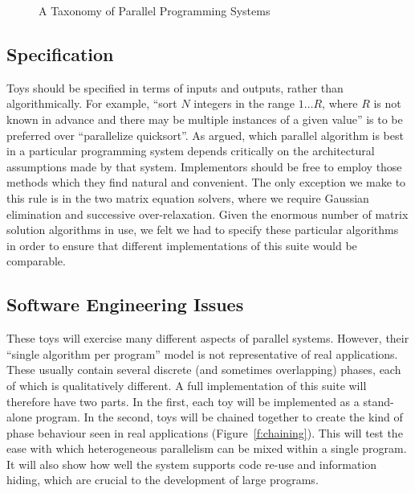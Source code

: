 \begin{figure}
\textheight
\begin{center}\mbox{}\end{center}
\caption{A Taxonomy of Parallel Programming Systems\label{f:taxonomy}}
\end{figure}

\subsection{Specification\label{s:method-spec}}

Toys should be specified in terms of inputs and outputs,
rather than algorithmically.
For example,
``sort $N$ integers in the range $1{\ldots}R$,
where $R$ is not known in advance and there may be multiple instances of a given value''
is to be preferred over
``parallelize quicksort''.
As \cite{b:slalom} argued,
which parallel algorithm is best in a particular programming system
depends critically on the architectural assumptions made by that system.
Implementors should be free to employ those methods which they find natural and convenient.
The only exception we make to this rule is in the two matrix equation solvers,
where we require Gaussian elimination and successive over-relaxation.
Given the enormous number of matrix solution algorithms in use,
we felt we had to specify these particular algorithms in order to ensure that
different implementations of this suite would be comparable.

\subsection{Software Engineering Issues\label{s:method-softeng}}

These toys will exercise many different aspects of parallel systems.
However,
their ``single algorithm per program'' model is not representative of real applications.
These usually contain several discrete (and sometimes overlapping) phases,
each of which is qualitatively different.
A full implementation of this suite will therefore have two parts.
In the first,
each toy will be implemented as a stand-alone program.
In the second,
toys will be chained together to create the kind of phase behaviour seen in real applications
(Figure~\ref{f:chaining}).
This will test the ease with which heterogeneous parallelism can be mixed within a single program.
It will also show how well the system supports code re-use and information hiding,
which are crucial to the development of large programs.

